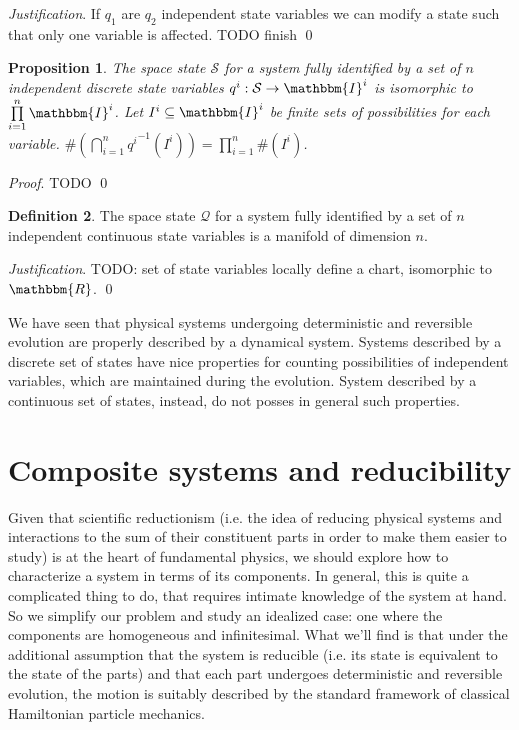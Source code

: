 \documentclass[aps,pra,10pt,twocolumn,floatfix,nofootinbib]{revtex4-1}
\newtheorem{prop}{Proposition}[section]
\theoremstyle{definition}
\newtheorem{defn}[prop]{Definition}
\newenvironment{justification}{\emph{Justification}.}{\qed}
\renewenvironment{proof}{\emph{Proof}.}{\qed}
\begin{document}
\begin{justification}
If $q_1$ are $q_2$ independent state variables we can modify a state such that only one variable is affected. TODO finish
\end{justification}

\begin{prop}\label{discrete_state_space}
The space state $\mathcal{S}$ for a system fully identified by a set of $n$ independent discrete state variables $q^i : \mathcal{S} \rightarrow \mathbbm{I}^i$ is isomorphic to $\prod\limits_{i=1}^n\mathbbm{I}^i$. Let $I^i \subseteq \mathbbm{I}^i$ be finite sets of possibilities for each variable. $\#(\bigcap\limits_{i=1}^{n}{q^i}^{-1}(I^i))=\prod\limits_{i=1}^{n}\#(I^i)$.
\end{prop}

\begin{proof}
TODO
\end{proof}

\begin{defn}\label{continuous_state_space}
The space state $\mathcal{Q}$ for a system fully identified by a set of $n$ independent continuous state variables is a manifold of dimension $n$.
\end{defn}

\begin{justification}
TODO: set of state variables locally define a chart, isomorphic to $\mathbbm{R}$.
\end{justification}

We have seen that physical systems undergoing deterministic and reversible evolution are properly described by a dynamical system. Systems described by a discrete set of states have nice properties for counting possibilities of independent variables, which are maintained during the evolution. System described by a continuous set of states, instead, do not posses in general such properties.

\section{Composite systems and reducibility}



Given that scientific reductionism (i.e. the idea of reducing physical systems and interactions to the sum of their constituent parts in order to make them easier to study) is at the heart of fundamental physics, we should explore how to characterize a system in terms of its components. In general, this is quite a complicated thing to do, that requires intimate knowledge of the system at hand. So we simplify our problem and study an idealized case: one where the components are homogeneous and infinitesimal. What we'll find is that under the additional assumption that the system is reducible (i.e. its state is equivalent to the state of the parts) and that each part undergoes deterministic and reversible evolution, the motion is suitably described by the standard framework of classical Hamiltonian particle mechanics.
\end{document}
